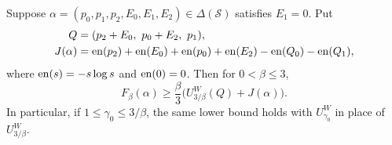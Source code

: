 \begin{proposition}
\label{prop:face}
Suppose $\alpha=(p_0,p_1,p_2,E_0,E_1,E_2)\in\Delta(\mathcal S)$ satisfies
$E_1=0$.  Put
\begin{align}
 Q&=(p_2+E_0,\ p_0+E_2,\ p_1),\label{val:face-Q}\\
 J(\alpha)&=\operatorname{en}(p_2)+\operatorname{en}(E_0)+\operatorname{en}(p_0)+\operatorname{en}(E_2)
                  -\operatorname{en}(Q_0)-\operatorname{en}(Q_1),\label{val:face-J}
\end{align}
where $\operatorname{en}(s)=-s\log s$ and $\operatorname{en}(0)=0$.  Then for $0<\beta\le3$,
\begin{equation}
 F_\beta(\alpha)\ge
 \frac\beta3\bigl(U^W_{3/\beta}(Q)+J(\alpha)\bigr).
\label{val:face-bound}
\end{equation}
In particular, if $1\le\gamma_0\le3/\beta$, the same lower bound holds
with $U^W_{\gamma_0}$ in place of $U^W_{3/\beta}$.
\end{proposition}

